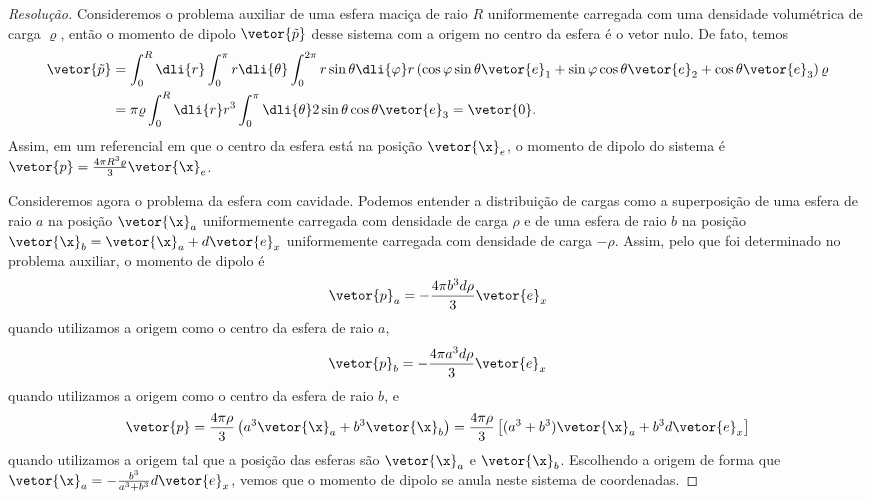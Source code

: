 \begin{proof}[Resolução]
    Consideremos o problema auxiliar de uma esfera maciça de raio \(R\) uniformemente carregada com uma densidade volumétrica de carga \(\varrho\), então o momento de dipolo \(\vetor{\tilde{p}}\) desse sistema com a origem no centro da esfera é o vetor nulo. De fato, temos
    \begin{align*}
        \vetor{\tilde{p}} &= \int_{0}^R \dli{r} \int_{0}^\pi r\dli{\theta} \int_0^{2\pi} r\sin\theta \dli{\varphi} r \left(\cos\varphi \sin\theta \vetor{e}_1 + \sin\varphi\cos\theta \vetor{e}_2 + \cos\theta \vetor{e}_3\right) \varrho\\
                          &= \pi \varrho \int_0^R \dli{r} r^3 \int_0^\pi \dli{\theta} 2\sin\theta \cos\theta \vetor{e}_3 = \vetor{0}.
    \end{align*}
    Assim, em um referencial em que o centro da esfera está na posição \(\vetor{\x}_e\), o momento de dipolo do sistema é \(\vetor{p} = \frac{4\pi R^3 \varrho}{3}\vetor{\x}_e\).

    Consideremos agora o problema da esfera com cavidade. Podemos entender a distribuição de cargas como a superposição de uma esfera de raio \(a\) na posição \(\vetor{\x}_a\) uniformemente carregada com densidade de carga \(\rho\) e de uma esfera de raio \(b\) na posição \(\vetor{\x}_b = \vetor{\x}_a + d\vetor{e}_x\) uniformemente carregada com densidade de carga \(-\rho\). Assim, pelo que foi determinado no problema auxiliar, o momento de dipolo é
    \begin{equation*}
        \vetor{p}_a =-\frac{4\pi b^3d\rho}{3} \vetor{e}_x
    \end{equation*}
    quando utilizamos a origem como o centro da esfera de raio \(a\),
    \begin{equation*}
        \vetor{p}_b = -\frac{4\pi a^3d\rho}{3}\vetor{e}_x
    \end{equation*}
    quando utilizamos a origem como o centro da esfera de raio \(b\), e
    \begin{equation*}
        \vetor{p} = \frac{4\pi\rho}{3}\left(a^3\vetor{\x}_a + b^3\vetor{\x}_b \right) = \frac{4\pi \rho}{3}\left[(a^3 + b^3)\vetor{\x}_a + b^3 d \vetor{e}_x\right]
    \end{equation*}
    quando utilizamos a origem tal que a posição das esferas são \(\vetor{\x}_a\) e \(\vetor{\x}_b\). Escolhendo a origem de forma que \(\vetor{\x}_a = -\frac{b^3}{a^3 + b^3} d\vetor{e}_x\), vemos que o momento de dipolo se anula neste sistema de coordenadas.
\end{proof}
